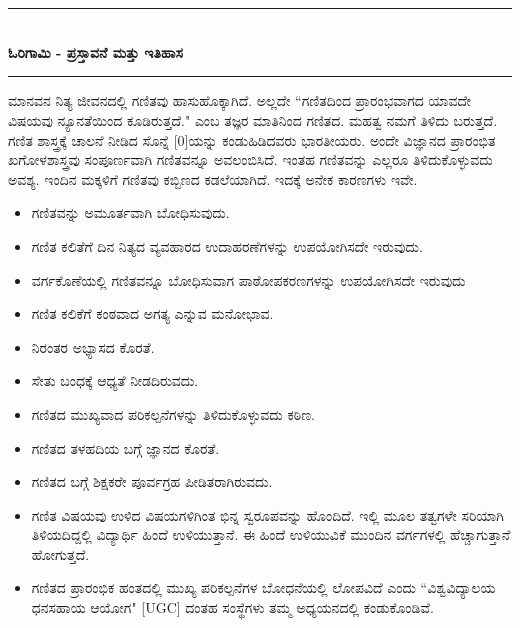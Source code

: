 
\chapter[ಭಾಗ -  1]{}\label{chap1}

\begin{center}
\rule{5cm}{1pt}\\[5pt]
{\Large\bfseries ಓರಿಗಾಮಿ - ಪ್ರಸ್ತಾವನೆ ಮತ್ತು ಇತಿಹಾಸ }\\[3pt]
\rule{5cm}{1pt}
\end{center}
 
 ಮಾನವನ ನಿತ್ಯ ಜೀವನದಲ್ಲಿ ಗಣಿತವು ಹಾಸುಹೊಕ್ಕಾಗಿದೆ. ಅಲ್ಲದೇ ``ಗಣಿತದಿಂದ ಪ್ರಾರಂಭವಾಗದ ಯಾವದೇ ವಿಷಯವು ನ್ಯೂನತೆಯಿಂದ ಕೂಡಿರುತ್ತದೆ." ಎಂಬ ತಜ್ಞರ ಮಾತಿನಿಂದ ಗಣಿತದ. ಮಹತ್ವ ನಮಗೆ ತಿಳಿದು ಬರುತ್ತದೆ. ಗಣಿತ ಶಾಸ್ತ್ರಕ್ಕೆ  ಚಾಲನೆ ನೀಡಿದ ಸೊನ್ನೆ [0]ಯನ್ನು ಕಂಡುಹಿಡಿದವರು ಭಾರತೀಯರು. ಅಂದೇ ವಿಜ್ಞಾನದ ಪ್ರಾರಂಭಿತ ಖಗೋಳಶಾಸ್ತ್ರವು ಸಂಪೂರ್ಣವಾಗಿ ಗಣಿತವನ್ನೂ ಅವಲಂಬಿಸಿದೆ. ಇಂತಹ ಗಣಿತವನ್ನು ಎಲ್ಲರೂ ತಿಳಿದುಕೊಳ್ಳುವದು ಅವಶ್ಯ. ಇಂದಿನ ಮಕ್ಕಳಿಗೆ ಗಣಿತವು ಕಬ್ಬಿಣದ ಕಡಲೆಯಾಗಿದೆ. ಇದಕ್ಕೆ ಅನೇಕ ಕಾರಣಗಳು ಇವೇ. 
 \begin{itemize} 
 \itemsep=2pt
 \item ಗಣಿತವನ್ನು ಅಮೂರ್ತವಾಗಿ ಬೋಧಿಸುವುದು. 
 
 \item ಗಣಿತ ಕಲಿತೆಗೆ ದಿನ ನಿತ್ಯದ ವ್ಯವಹಾರದ ಉದಾಹರಣೆಗಳನ್ನು ಉಪಯೋಗಿಸದೇ ಇರುವುದು.
 
 \item ವರ್ಗಕೊಣೆಯಲ್ಲಿ ಗಣಿತವನ್ನೂ ಬೋಧಿಸುವಾಗ ಪಾಠೋಪಕರಣಗಳನ್ನು ಉಪಯೋಗಿಸದೇ ಇರುವುದು
 
 \item ಗಣಿತ ಕಲಿಕೆಗೆ ಕಂಠವಾದ ಅಗತ್ಯ ಎನ್ನುವ ಮನೋಭಾವ.

\item ನಿರಂತರ ಅಭ್ಯಾಸದ ಕೊರತೆ.
 
 \item  ಸೇತು ಬಂಧಕ್ಕೆ ಆಧ್ಯತೆ ನೀಡದಿರುವದು.
 
 \item ಗಣಿತದ ಮುಖ್ಯವಾದ ಪರಿಕಲ್ಪನೆಗಳನ್ನು ತಿಳಿದುಕೊಳ್ಳುವದು ಕಠಿಣ.
 
 \item ಗಣಿತದ ತಳಹದಿಯ ಬಗ್ಗೆ ಜ್ಞಾನದ ಕೊರತೆ. 
 
 \item ಗಣಿತದ ಬಗ್ಗೆ ಶಿಕ್ಷಕರೇ ಪೂರ್ವಗ್ರಹ ಪೀಡಿತರಾಗಿರುವದು.
 
 \item ಗಣಿತ ವಿಷಯವು ಉಳಿದ ವಿಷಯಗಳಿಗಿಂತ ಭಿನ್ನ ಸ್ವರೂಪವನ್ನು ಹೊಂದಿದೆ. ಇಲ್ಲಿ ಮೂಲ ತತ್ವಗಳೇ ಸರಿಯಾಗಿ ತಿಳಿಯದಿದ್ದಲ್ಲಿ ವಿದ್ಯಾರ್ಥಿ ಹಿಂದೆ ಉಳಿಯುತ್ತಾನೆ. ಈ ಹಿಂದೆ ಉಳಿಯುವಿಕೆ ಮುಂದಿನ ವರ್ಗಗಳಲ್ಲಿ ಹೆಚ್ಚಾಗುತ್ತಾನೆ ಹೋಗುತ್ತದೆ. 
  
 \item ಗಣಿತದ ಪ್ರಾರಂಭಿಕ ಹಂತದಲ್ಲಿ ಮುಖ್ಯ ಪರಿಕಲ್ಪನೆಗಳ ಬೋಧನೆಯಲ್ಲಿ ಲೋಪವಿದೆ ಎಂದು ``ವಿಶ್ವವಿದ್ಯಾಲಯ ಧನಸಹಾಯ ಆಯೋಗ" [UGC] ದಂತಹ ಸಂಸ್ಥೆಗಳು ತಮ್ಮ ಅಧ್ಯಯನದಲ್ಲಿ ಕಂಡುಕೊಂಡಿವೆ. 
 \end{itemize}
 
